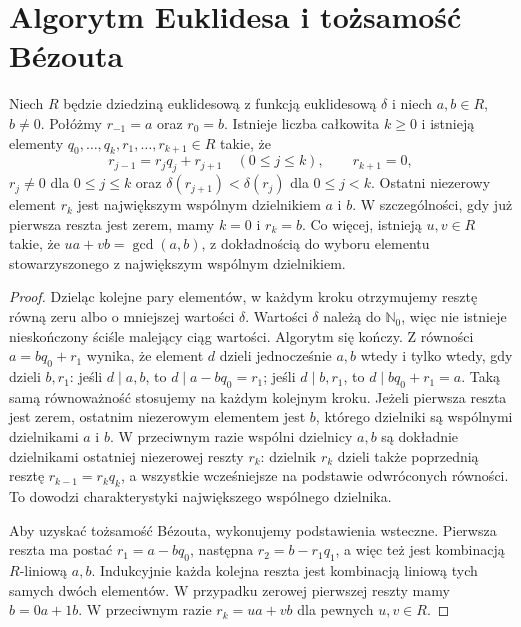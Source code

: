 \section{Algorytm Euklidesa i tożsamość Bézouta}
\begin{twierdzenie}
\label{aa:tw:euclidean-algorithm}
Niech $R$ będzie dziedziną euklidesową z funkcją euklidesową
$\delta$ i niech $a,b\in R$, $b\ne0$. Połóżmy
$r_{-1}=a$ oraz $r_0=b$. Istnieje liczba całkowita $k\ge0$ i istnieją elementy
$q_0,\ldots,q_k,r_1,\ldots,r_{k+1}\in R$
takie, że
\[
r_{j-1}=r_jq_j+r_{j+1}\quad(0\le j\le k),
\qquad r_{k+1}=0,
\]
$r_j\ne0$ dla $0\le j\le k$ oraz
$\delta(r_{j+1})<\delta(r_j)$ dla $0\le j<k$.
Ostatni niezerowy element $r_k$ jest największym wspólnym
dzielnikiem $a$ i $b$. W szczególności, gdy już pierwsza
reszta jest zerem, mamy $k=0$ i $r_k=b$.
Co więcej, istnieją $u,v\in R$ takie, że
$ua+vb=\gcd(a,b)$, z dokładnością do wyboru elementu
stowarzyszonego z największym wspólnym dzielnikiem.
\end{twierdzenie}
\begin{proof}
Dzieląc kolejne pary elementów, w każdym kroku otrzymujemy
resztę równą zeru albo o mniejszej wartości $\delta$.
Wartości $\delta$ należą do $\mathbb N_0$, więc nie istnieje
nieskończony ściśle malejący ciąg wartości. Algorytm się kończy.
Z równości $a=bq_0+r_1$ wynika, że element $d$ dzieli
jednocześnie $a,b$ wtedy i tylko wtedy, gdy dzieli $b,r_1$:
jeśli $d\mid a,b$, to $d\mid a-bq_0=r_1$;
jeśli $d\mid b,r_1$, to $d\mid bq_0+r_1=a$.
Taką samą równoważność stosujemy na każdym kolejnym kroku.
Jeżeli pierwsza reszta jest zerem, ostatnim niezerowym
elementem jest $b$, którego dzielniki są wspólnymi dzielnikami
$a$ i $b$. W przeciwnym razie wspólni dzielnicy $a,b$ są
dokładnie dzielnikami ostatniej niezerowej reszty $r_k$: dzielnik $r_k$
dzieli także poprzednią resztę $r_{k-1}=r_k q_k$,
a wszystkie wcześniejsze na podstawie odwróconych równości.
To dowodzi charakterystyki największego wspólnego dzielnika.

Aby uzyskać tożsamość Bézouta, wykonujemy podstawienia wsteczne.
Pierwsza reszta ma postać $r_1=a-bq_0$,
następna $r_2=b-r_1q_1$, a więc też jest kombinacją
$R$-liniową $a,b$. Indukcyjnie każda kolejna reszta
jest kombinacją liniową tych samych dwóch elementów.
W przypadku zerowej pierwszej reszty mamy $b=0a+1b$.
W przeciwnym razie $r_k=ua+vb$ dla pewnych $u,v\in R$.
\end{proof}


